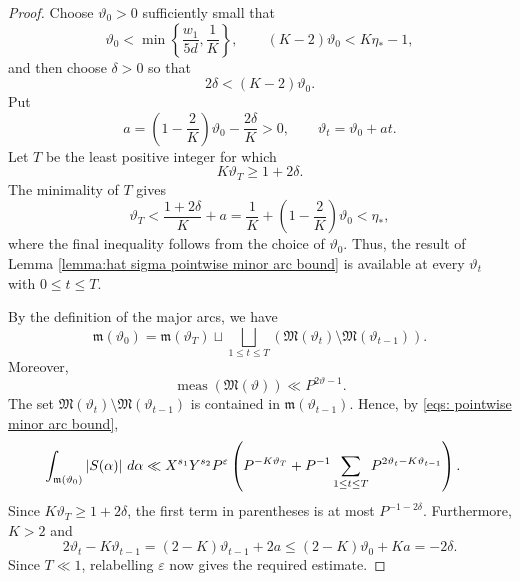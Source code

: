 \documentclass[10pt,a4paper]{amsart}
\def\a{{\alpha}} \def\bfalp{{\boldsymbol \alpha}} \def\atil{{\widetilde \alpha}}
\def\d{{\,{\rm d}}}
\def\eps{\varepsilon}
\def\grm{{\mathfrak m}}\def\grM{{\mathfrak M}}
\begin{document}
\begin{proof}
    Choose $\vartheta_0>0$ sufficiently small that
    \[
        \vartheta_0<\min\left\{\frac{w_1}{5d},\frac1K\right\},
        \qquad
        (K-2)\vartheta_0<K\eta_*-1,
    \]
    and then choose $\delta>0$ so that
    \[
        2\delta<(K-2)\vartheta_0.
    \]
    Put
    \[
        a=\left(1-\frac{2}{K}\right)\vartheta_0
        -\frac{2\delta}{K}>0,
        \qquad
        \vartheta_t=\vartheta_0+at.
    \]
    Let $T$ be the least positive integer for which
    \[
        K\vartheta_T\geq1+2\delta.
    \]
    The minimality of $T$ gives
    \[
        \vartheta_T<\frac{1+2\delta}{K}+a
        =\frac1K+\left(1-\frac2K\right)\vartheta_0
        <\eta_*,
    \]
    where the final inequality follows from the choice of $\vartheta_0$.
    Thus, the result of Lemma
    \ref{lemma:hat sigma pointwise minor arc bound} is available at every
    $\vartheta_t$ with $0\leq t\leq T$.

    By the definition of the major arcs, we have
    \[
        \grm(\vartheta_0)
        =\grm(\vartheta_T)\sqcup
        \bigsqcup_{1\leq t\leq T}
        \left(\grM(\vartheta_t)\setminus
        \grM(\vartheta_{t-1})\right).
    \]
    Moreover,
    \[
        \operatorname{meas}(\grM(\vartheta))
        \ll P^{2\vartheta-1}.
    \]
    The set
    $\grM(\vartheta_t)\setminus\grM(\vartheta_{t-1})$ is contained in
    $\grm(\vartheta_{t-1})$. Hence, by
    \eqref{eqs: pointwise minor arc bound},
    \begin{align*}
        \int_{\grm(\vartheta_0)}|S(\a)|\,\d\a
        &\ll X^{s_1}Y^{s_2}P^\eps
        \left(
            P^{-K\vartheta_T}
            +P^{-1}\sum_{1\leq t\leq T}
            P^{2\vartheta_t-K\vartheta_{t-1}}
        \right).
    \end{align*}
    Since $K\vartheta_T\geq1+2\delta$, the first term in parentheses is
    at most $P^{-1-2\delta}$. Furthermore, $K>2$ and
    \[
        2\vartheta_t-K\vartheta_{t-1}
        =(2-K)\vartheta_{t-1}+2a
        \leq(2-K)\vartheta_0+Ka
        =-2\delta.
    \]
    Since $T\ll1$, relabelling $\eps$ now gives the required estimate.
\end{proof}
\end{document}
